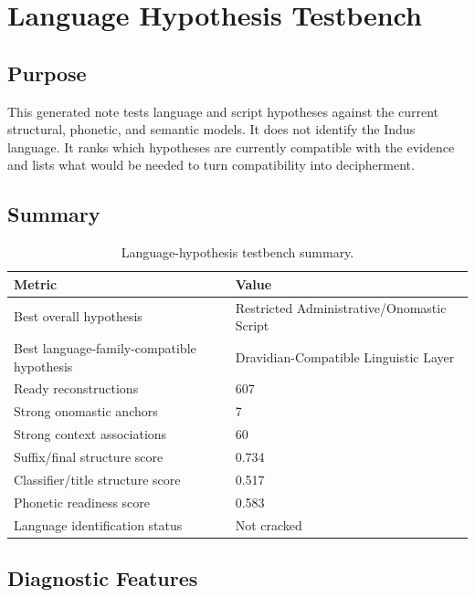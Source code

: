 \section{Language Hypothesis Testbench}

\subsection{Purpose}

This generated note tests language and script hypotheses against the current structural, phonetic, and semantic models. It does not identify the Indus language. It ranks which hypotheses are currently compatible with the evidence and lists what would be needed to turn compatibility into decipherment.

\subsection{Summary}

\begin{table}[htbp]
\centering
\footnotesize
\begin{tabular}{p{}p{}}
\toprule
\textbf{Metric} & \textbf{Value} \\
\midrule
Best overall hypothesis & Restricted Administrative/Onomastic Script \\
Best language-family-compatible hypothesis & Dravidian-Compatible Linguistic Layer \\
Ready reconstructions & 607 \\
Strong onomastic anchors & 7 \\
Strong context associations & 60 \\
Suffix/final structure score & 0.734 \\
Classifier/title structure score & 0.517 \\
Phonetic readiness score & 0.583 \\
Language identification status & Not cracked \\
\bottomrule
\end{tabular}
\caption{Language-hypothesis testbench summary.}
\end{table}

\subsection{Diagnostic Features}

